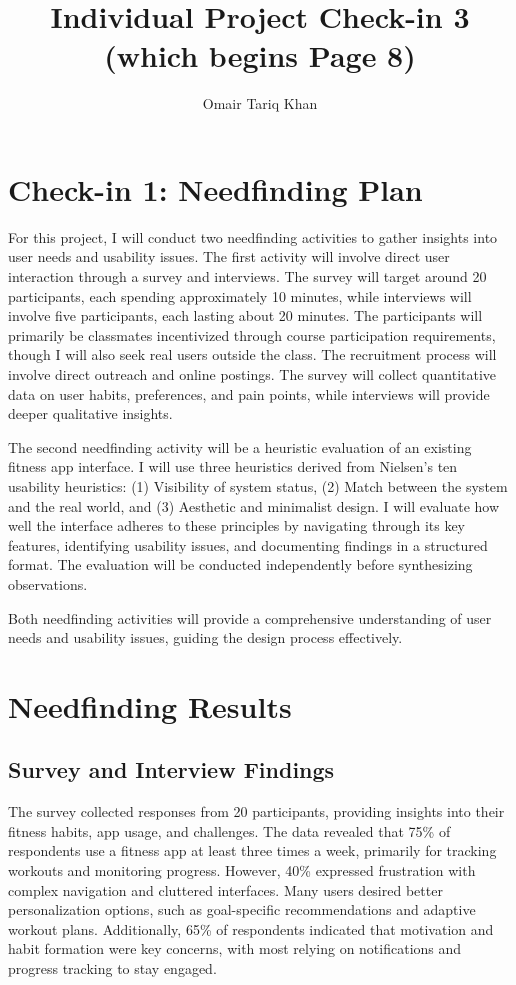 \documentclass[
	letterpaper, %
]{jdf}
\author{Omair Tariq Khan}
\title{Individual Project Check-in 3 (which begins Page 8)}
\begin{document}

\maketitle
\hfill \break

\section{Check-in 1: Needfinding Plan}
For this project, I will conduct two needfinding activities to gather insights into user needs and usability issues. The first activity will involve direct user interaction through a survey and interviews. The survey will target around 20 participants, each spending approximately 10 minutes, while interviews will involve five participants, each lasting about 20 minutes. The participants will primarily be classmates incentivized through course participation requirements, though I will also seek real users outside the class. The recruitment process will involve direct outreach and online postings. The survey will collect quantitative data on user habits, preferences, and pain points, while interviews will provide deeper qualitative insights.

The second needfinding activity will be a heuristic evaluation of an existing fitness app interface. I will use three heuristics derived from Nielsen’s ten usability heuristics: (1) Visibility of system status, (2) Match between the system and the real world, and (3) Aesthetic and minimalist design. I will evaluate how well the interface adheres to these principles by navigating through its key features, identifying usability issues, and documenting findings in a structured format. The evaluation will be conducted independently before synthesizing observations.

Both needfinding activities will provide a comprehensive understanding of user needs and usability issues, guiding the design process effectively.
\newpage

\section{Needfinding Results }
\subsection {Survey and Interview Findings}
The survey collected responses from 20 participants, providing insights into their fitness habits, app usage, and challenges. The data revealed that 75\% of respondents use a fitness app at least three times a week, primarily for tracking workouts and monitoring progress. However, 40\% expressed frustration with complex navigation and cluttered interfaces. Many users desired better personalization options, such as goal-specific recommendations and adaptive workout plans. Additionally, 65\% of respondents indicated that motivation and habit formation were key concerns, with most relying on notifications and progress tracking to stay engaged.
\end{document}
